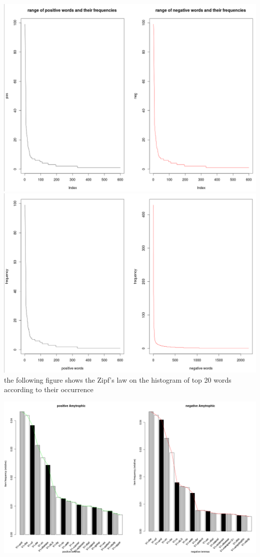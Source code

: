 \documentclass{article}
\begin{document}
	\includegraphics[width=0.8\linewidth]{Amytrophic5.png}\\
	\includegraphics[width=0.8\linewidth]{Amytrophic6.png}\\
	\newpage
	the following figure shows the Zipf's law on the histogram of top 20 words according to their occurrence
	
	\includegraphics[width=0.8\linewidth]{Amytrophic7.png}\\
	
\end{document}

